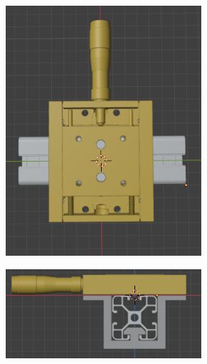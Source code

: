 \begin{figure}[!ht]
	\begin{minipage}[c]{0.5\textwidth}
			\begin{subfigure}{\textwidth}
					\centering
					\includegraphics[width=0.8\textwidth]{Figures/21_04_2025/Vista_frontal_tornillo_perfil}
					\captionsetup{width=0.8\textwidth}
					\label{fig:}
				\end{subfigure}
		\end{minipage}\begin{minipage}[c]{0.49\textwidth}
			\begin{subfigure}{\textwidth}
					\centering
					\includegraphics[width=0.8\textwidth]{Figures/21_04_2025/Vista_lateral_tornillo_perfil}
					\captionsetup{width=0.8\textwidth}
					\label{fig:}
				\end{subfigure}
		\end{minipage}


\end{figure}
